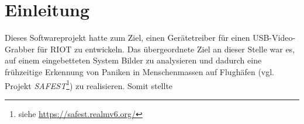 \section{Einleitung}
Dieses Softwareprojekt hatte zum Ziel, einen Gerätetreiber für einen USB-Video-Grabber für RIOT zu entwickeln.
Das übergeordnete Ziel an dieser Stelle war es, auf einem eingebetteten System Bilder zu analysieren und dadurch eine frühzeitige  Erkennung von Paniken in Menschenmassen auf Flughäfen (vgl. Projekt \emph{SAFEST}\footnote{siehe \url{https://safest.realmv6.org/}}) zu realisieren.
Somit stellte